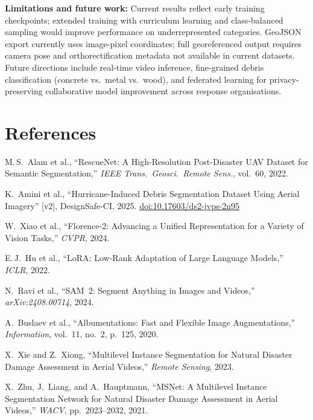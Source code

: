 \documentclass[10pt,a4paper,twocolumn]{article}
\begin{document}
\textbf{Limitations and future work:} Current results reflect early training checkpoints; extended training with curriculum learning and class-balanced sampling would improve performance on underrepresented categories. GeoJSON export currently uses image-pixel coordinates; full georeferenced output requires camera pose and orthorectification metadata not available in current datasets. Future directions include real-time video inference, fine-grained debris classification (concrete vs.\ metal vs.\ wood), and federated learning for privacy-preserving collaborative model improvement across response organisations.


\section{References}

\fontsize{7.5}{9.5}\selectfont
\setlength{\parskip}{2pt}

\noindent[1] M.\,S.\ Alam et al., ``RescueNet: A High-Resolution Post-Disaster UAV Dataset for Semantic Segmentation,'' \textit{IEEE Trans.\ Geosci.\ Remote Sens.}, vol.~60, 2022.

\noindent[2] K.\ Amini et al., ``Hurricane-Induced Debris Segmentation Dataset Using Aerial Imagery'' [v2], DesignSafe-CI, 2025. \href{https://doi.org/10.17603/ds2-jvps-2n95}{doi:10.17603/ds2-jvps-2n95}

\noindent[3] W.\ Xiao et al., ``Florence-2: Advancing a Unified Representation for a Variety of Vision Tasks,'' \textit{CVPR}, 2024.

\noindent[4] E.\,J.\ Hu et al., ``LoRA: Low-Rank Adaptation of Large Language Models,'' \textit{ICLR}, 2022.

\noindent[5] N.\ Ravi et al., ``SAM~2: Segment Anything in Images and Videos,'' \textit{arXiv:2408.00714}, 2024.

\noindent[6] A.\ Buslaev et al., ``Albumentations: Fast and Flexible Image Augmentations,'' \textit{Information}, vol.~11, no.~2, p.~125, 2020.

\noindent[7] X.\ Xie and Z.\ Xiong, ``Multilevel Instance Segmentation for Natural Disaster Damage Assessment in Aerial Videos,'' \textit{Remote Sensing}, 2023.

\noindent[8] X.\ Zhu, J.\ Liang, and A.\ Hauptmann, ``MSNet: A Multilevel Instance Segmentation Network for Natural Disaster Damage Assessment in Aerial Videos,'' \textit{WACV}, pp.~2023--2032, 2021.
\end{document}
